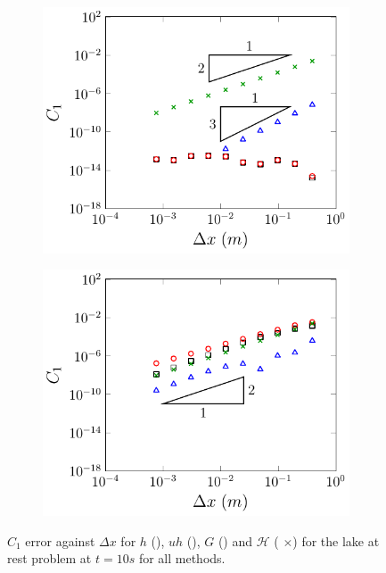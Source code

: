 \begin{figure}
\begin{subfigure}{0.5\textwidth}
	\end{subfigure}
	\begin{subfigure}{0.5\textwidth}
		\includegraphics[width=\textwidth]{./chp5/figures/Analytic/LakeAtRest/C1/FDVMWB.pdf}
		\vspace{0.5cm}
	\end{subfigure}%
	\begin{subfigure}{0.5\textwidth}
		\includegraphics[width=\textwidth]{./chp5/figures/Analytic/LakeAtRest/C1/FDVMnWB.pdf}
		\vspace{0.5cm}
	\end{subfigure}
	\caption{$C_1$ error against $\Delta x$ for $h$ (), $uh$ (), $G$ () and $\mathcal{H}$ ({\color{green!60!black} $\times$}) for the lake at rest problem at $t=10s$ for all methods.}
	\label{fig:LakeAtRestEC1}
\end{figure}

